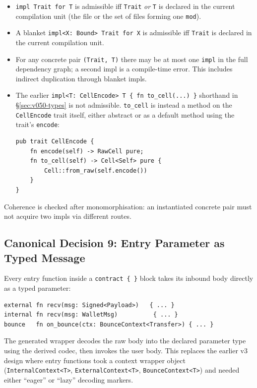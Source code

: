 \documentclass[12pt,oneside]{article}
\begin{document}
\begin{itemize}
\item \verb|impl Trait for T| is admissible iff \verb|Trait| \emph{or}
\verb|T| is declared in the current compilation unit (the file or the
set of files forming one \verb|mod|).
\item A blanket \verb|impl<X: Bound> Trait for X| is admissible iff
\verb|Trait| is declared in the current compilation unit.
\item For any concrete pair \verb|(Trait, T)| there may be at most one
\verb|impl| in the full dependency graph; a second impl is a
compile-time error. This includes indirect duplication through blanket
impls.
\item The earlier \verb|impl<T: CellEncode> T { fn to_cell(...) }| shorthand
in \S\ref{sec:v050-types} is not admissible. \verb|to_cell| is instead a
method on the \verb|CellEncode| trait itself, either abstract or as a
default method using the trait's \verb|encode|:

\begin{verbatim}
pub trait CellEncode {
    fn encode(self) -> RawCell pure;
    fn to_cell(self) -> Cell<Self> pure {
        Cell::from_raw(self.encode())
    }
}
\end{verbatim}
\end{itemize}

Coherence is checked after monomorphisation: an instantiated concrete pair
must not acquire two impls via different routes.

\subsection{Canonical Decision 9: Entry Parameter as Typed Message}
\label{sec:cd-entry-typed}
Every entry function inside a \verb|contract { }| block takes its
inbound body directly as a typed parameter:

\begin{verbatim}
external fn recv(msg: Signed<Payload>)   { ... }
internal fn recv(msg: WalletMsg)          { ... }
bounce   fn on_bounce(ctx: BounceContext<Transfer>) { ... }
\end{verbatim}

The generated wrapper decodes the raw body into the declared parameter
type using the derived codec, then invokes the user body. This
replaces the earlier v3 design where entry functions took a context
wrapper object (\verb|InternalContext<T>|, \verb|ExternalContext<T>|,
\verb|BounceContext<T>|) and needed either ``eager'' or ``lazy''
decoding markers.
\end{document}
